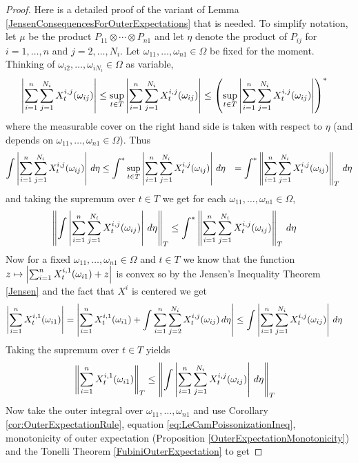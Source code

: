 \begin{proof}
Here is a detailed proof of the variant of  Lemma \ref{JensenConsequencesForOuterExpectations}  that is needed.  To simplify notation, let $\mu$ be the product $P_{11} \otimes \dotsb \otimes P_{n1}$
and let $\eta$ denote the product of $P_{ij}$ for $i=1, \dotsc, n$ and $j=2,\dotsc, N_i$.  Let $\omega_{11}, \dotsc, \omega_{n1} \in \Omega$ be fixed for the moment.  Thinking of $\omega_{i2}, \dotsc, \omega_{iN_i} \in \Omega$ as variable,
\begin{align*}
\left \vert \sum_{i=1}^n \sum_{j=1}^{N_i} X_t^{i,j}(\omega_{ij}) \right \vert &\leq \sup_{t \in T} \left \vert \sum_{i=1}^n \sum_{j=1}^{N_i} X_t^{i,j}(\omega_{ij}) \right \vert \leq \left(\sup_{t \in T} \left \vert \sum_{i=1}^n \sum_{j=1}^{N_i} X_t^{i,j}(\omega_{ij}) \right \vert \right)^*
\end{align*}
where the measurable cover on the right hand side is taken with respect to $\eta$ (and depends on $\omega_{11}, \dotsc, \omega_{n1} \in \Omega$).  Thus 
\begin{align*}
\int \left \vert \sum_{i=1}^n \sum_{j=1}^{N_i} X_t^{i,j}(\omega_{ij}) \right \vert \, d\eta 
&\leq \int^* \sup_{t \in T} \left \vert \sum_{i=1}^n \sum_{j=1}^{N_i} X_t^{i,j}(\omega_{ij}) \right \vert \, d\eta
&=\int^* \left \lVert \sum_{i=1}^n \sum_{j=1}^{N_i} X_t^{i,j}(\omega_{ij}) \right \rVert_T \, d\eta
\end{align*} 
and taking the supremum over $t \in T$ we get for each $\omega_{11}, \dotsc, \omega_{n1} \in \Omega$,
\begin{align}\label{eq:LeCamPoissonizationIneq}
\left \lVert \int \left \vert \sum_{i=1}^n \sum_{j=1}^{N_i} X_t^{i,j}(\omega_{ij}) \right \vert \, d\eta \right \rVert_{T} 
&\leq \int^* \left \lVert \sum_{i=1}^n \sum_{j=1}^{N_i} X_t^{i,j}(\omega_{ij}) \right \rVert_T \, d\eta
\end{align} 
Now for a fixed $\omega_{11}, \dotsc, \omega_{n1}  \in \Omega$ and $t \in T$ we know that the function $z \mapsto \left \vert \sum_{i=1}^n X^{i,1}_t(\omega_{i1})+ z \right \vert$ is convex so by the Jensen's Inequality Theorem \ref{Jensen} and the fact that $X^i$ is centered we get 
\begin{align*}
\left \vert \sum_{i=1}^n X^{i,1}_t(\omega_{i1}) \right \vert &= \left \vert \sum_{i=1}^n X^{i,1}_t(\omega_{i1}) + \int \sum_{i=1}^n \sum_{j=2}^{N_i} X_t^{i,j}(\omega_{ij}) \, d\eta \right \vert 
\leq \int \left \vert \sum_{i=1}^n \sum_{j=1}^{N_i} X_t^{i,j}(\omega_{ij}) \right \vert \, d\eta
\end{align*}
Taking the supremum over $t \in T$ yields
\begin{align*}
\left \lVert \sum_{i=1}^n X^{i,1}_t(\omega_{i1}) \right \rVert_T &\leq \left \lVert \int \left \vert \sum_{i=1}^n \sum_{j=1}^{N_i} X_t^{i,j}(\omega_{ij}) \right \vert \, d\eta \right \rVert_T
\end{align*}
Now take the outer integral over $\omega_{11}, \dotsc, \omega_{n1}$ and use Corollary \ref{cor:OuterExpectationRule}, equation \eqref{eq:LeCamPoissonizationIneq}, monotonicity of outer expectation (Proposition \ref{OuterExpectationMonotonicity}) and the Tonelli Theorem \ref{FubiniOuterExpectation} to get

\end{proof}
